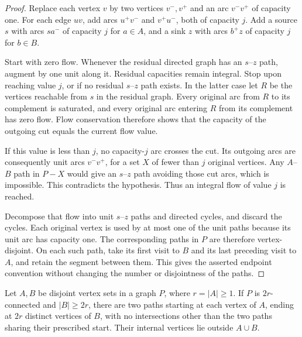 \begin{proof}
Replace each vertex $v$ by two vertices $v^-,v^+$ and an arc
$v^-v^+$ of capacity one.  For each edge $uv$, add arcs $u^+v^-$ and
$v^+u^-$, both of capacity $j$.  Add a source $s$ with arcs $sa^-$ of
capacity $j$ for $a\in A$, and a sink $z$ with arcs $b^+z$ of capacity $j$
for $b\in B$.

Start with zero flow.  Whenever the residual directed graph has an
$s$--$z$ path, augment by one unit along it.  Residual capacities remain
integral.  Stop upon reaching value $j$, or if no residual $s$--$z$ path
exists.  In the latter case let $R$ be the vertices reachable from $s$ in
the residual graph.  Every original arc from $R$ to its complement is
saturated, and every original arc entering $R$ from its complement has
zero flow.  Flow conservation therefore shows that the capacity of the
outgoing cut equals the current flow value.

If this value is less than $j$, no capacity-$j$ arc crosses the cut.
Its outgoing arcs are consequently unit arcs $v^-v^+$, for a set $X$ of
fewer than $j$ original vertices.  Any $A$--$B$ path in $P-X$ would give
an $s$--$z$ path avoiding those cut arcs, which is impossible.  This
contradicts the hypothesis.  Thus an integral flow of value $j$ is reached.

Decompose that flow into unit $s$--$z$ paths and directed cycles, and
discard the cycles.  Each original vertex is used by at most one of the
unit paths because its unit arc has capacity one.  The corresponding
paths in $P$ are therefore vertex-disjoint.  On each such path, take its
first visit to $B$ and its last preceding visit to $A$, and retain the
segment between them.  This gives the asserted endpoint convention
without changing the number or disjointness of the paths.
\end{proof}

\begin{lemma}\label{lem:double-packing}
Let $A,B$ be disjoint vertex sets in a graph $P$, where $r=|A|\ge1$.
If $P$ is $2r$-connected and $|B|\ge2r$, there are two paths starting at
each vertex of $A$, ending at $2r$ distinct vertices of $B$, with no
intersections other than the two paths sharing their prescribed start.
Their internal vertices lie outside $A\cup B$.
\end{lemma}

